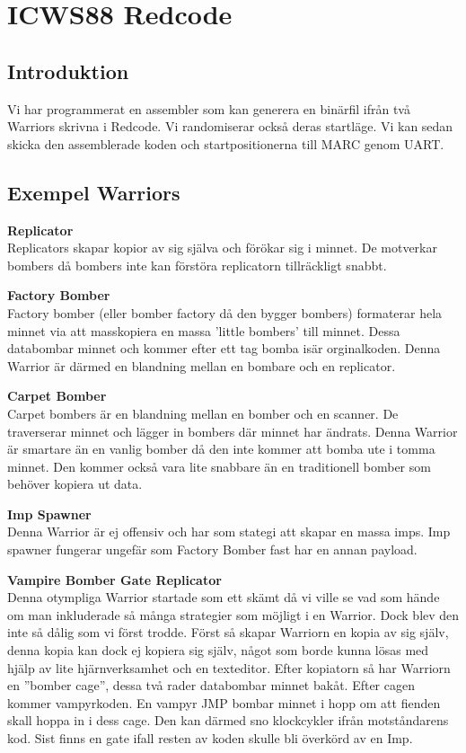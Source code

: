 \documentclass[11pt]{article}
\begin{document}
\section{ICWS88 Redcode}

\subsection{Introduktion}
Vi har programmerat en assembler som kan generera en binärfil ifrån två Warriors skrivna i Redcode. Vi randomiserar också deras startläge. Vi kan sedan skicka den assemblerade koden och startpositionerna till MARC genom UART.

\subsection{Exempel Warriors}

\textbf{Replicator} \\
Replicators skapar kopior av sig själva och förökar sig i minnet. De motverkar bombers då bombers inte kan förstöra replicatorn tillräckligt snabbt.

\textbf{Factory Bomber} \\
Factory bomber (eller bomber factory då den bygger bombers) formaterar hela minnet via att masskopiera en massa ’little bombers’ till minnet. Dessa databombar minnet och kommer efter ett tag bomba isär orginalkoden. Denna Warrior är därmed en blandning mellan en bombare och en replicator.

\textbf{Carpet Bomber} \\
Carpet bombers är en blandning mellan en bomber och en scanner. De traverserar minnet och lägger in bombers där minnet har ändrats. Denna Warrior är smartare än en vanlig bomber då den inte kommer att bomba ute i tomma minnet. Den kommer också vara lite snabbare än en traditionell bomber som behöver kopiera ut data.

\textbf{Imp Spawner} \\
Denna Warrior är ej offensiv och har som stategi att skapar en massa imps. Imp spawner fungerar ungefär som Factory Bomber fast har en annan payload.

\textbf{Vampire Bomber Gate Replicator} \\
Denna otympliga Warrior startade som ett skämt då vi ville se vad som hände om man inkluderade så många strategier som möjligt i en Warrior. Dock blev den inte så dålig som vi först trodde. Först så skapar Warriorn en kopia av sig själv, denna kopia kan dock ej kopiera sig själv, något som borde kunna lösas med hjälp av lite hjärnverksamhet och en texteditor. Efter kopiatorn så har Warriorn en ”bomber cage”, dessa två rader databombar minnet bakåt. Efter cagen kommer vampyrkoden. En vampyr JMP bombar minnet i hopp om att fienden skall hoppa in i dess cage. Den kan därmed sno klockcykler ifrån motståndarens kod. Sist finns en gate ifall resten av koden skulle bli överkörd av en Imp.
\end{document}
